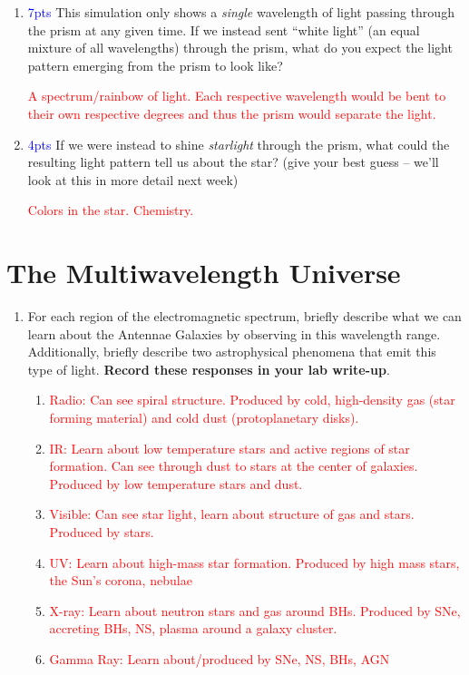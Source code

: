 \documentclass[11pt]{article}
\begin{document}
\begin{enumerate}
\begin{enumerate}
        \item \textcolor{blue}{7pts} This simulation only shows a \emph{single} wavelength of light passing through the prism at any given time. If we instead sent ``white light'' (an equal mixture of all wavelengths) through the prism, what do you expect the light pattern emerging from the prism to look like? 
        
        \textcolor{red}{A spectrum/rainbow of light.  Each respective wavelength would be bent to their own respective degrees and thus the prism would separate the light.}
        
        \item \textcolor{blue}{4pts} If we were instead to shine \emph{starlight} through the prism, what could the resulting light pattern tell us about the star? (give your best guess -- we'll look at this in more detail next week)
        
        \textcolor{red}{Colors in the star. Chemistry.}
        
    \end{enumerate}
\end{enumerate}

\section{The Multiwavelength Universe}

\begin{enumerate}
    \item For each region of the electromagnetic spectrum, briefly describe what we can learn about the Antennae Galaxies by observing in this wavelength range. Additionally, briefly describe two astrophysical phenomena that emit this type of light. \textbf{Record these responses in your lab write-up}.
    
    \begin{enumerate}
        \item \textcolor{red}{Radio: Can see spiral structure.  Produced by cold, high-density gas (star forming material) and cold dust (protoplanetary disks).}
        \item \textcolor{red}{IR: Learn about low temperature stars and active regions of star formation. Can see through dust to stars at the center of galaxies.  Produced by low temperature stars and dust.}
        \item \textcolor{red}{Visible: Can see star light, learn about structure of gas and stars. Produced by stars.}
        \item \textcolor{red}{UV: Learn about high-mass star formation. Produced by high mass stars, the Sun's corona, nebulae}
        \item \textcolor{red}{X-ray: Learn about neutron stars and gas around BHs. Produced by SNe, accreting BHs, NS, plasma around a galaxy cluster.}
        \item \textcolor{red}{Gamma Ray: Learn about/produced by SNe, NS, BHs, AGN}
    \end{enumerate}
\end{enumerate}
\end{document}
